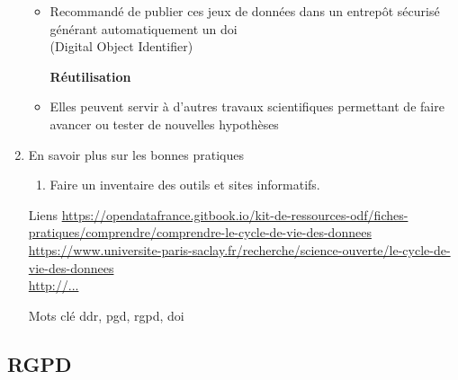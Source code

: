 \documentclass{book}
\begin{document}
\begin{enumerate}
\begin{itemize}
        \item Recommandé de publier ces jeux de données dans un entrepôt sécurisé générant automatiquement un \gls{doi} \\(Digital Object Identifier)
        \item[\textbf{Réutilisation}]
        \item Elles peuvent servir à d’autres travaux scientifiques permettant de faire avancer ou tester de nouvelles hypothèses
        \end{itemize}
    \item En savoir plus sur les bonnes pratiques
    \begin{enumerate}
        \item Faire un inventaire des outils et sites informatifs.
    \end{enumerate}
\end{enumerate}

\begin{itemize}
    \item [Liens]
        \url{https://opendatafrance.gitbook.io/kit-de-ressources-odf/fiches-pratiques/comprendre/comprendre-le-cycle-de-vie-des-donnees}\\
        \url{https://www.universite-paris-saclay.fr/recherche/science-ouverte/le-cycle-de-vie-des-donnees}\\
        \url{http://...}\\
    \item [Mots clé]
        \gls{ddr}, \gls{pgd}, \gls{rgpd}, \gls{doi}
\end{itemize}

\subsection{RGPD}
\end{document}

